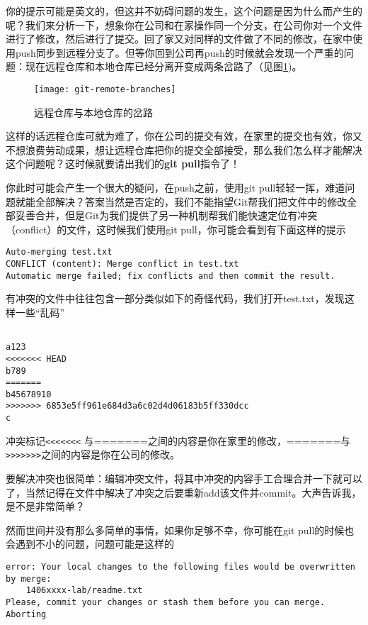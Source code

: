 你的提示可能是英文的，但这并不妨碍问题的发生，这个问题是因为什么而产生的呢？我们来分析一下，想象你在公司和在家操作同一个分支，在公司你对一个文件进行了修改，然后进行了提交。回了家又对同样的文件做了不同的修改，在家中使用push同步到远程分支了。但等你回到公司再push的时候就会发现一个严重的问题：现在远程仓库和本地仓库已经分离开变成两条岔路了（见图\ref{git-remote-branches})。

\begin{figure}[htbp]
  \centering
  \texttt{[image: git-remote-branches]}
  \caption{远程仓库与本地仓库的岔路}\label{git-remote-branches}
\end{figure}

这样的话远程仓库可就为难了，你在公司的提交有效，在家里的提交也有效，你又不想浪费劳动成果，想让远程仓库把你的提交全部接受，那么我们怎么样才能解决这个问题呢？这时候就要请出我们的\textbf{git pull}指令了！

你此时可能会产生一个很大的疑问，在push之前，使用git pull轻轻一挥，难道问题就能全部解决？答案当然是否定的，我们不能指望Git帮我们把文件中的修改全部妥善合并，但是Git为我们提供了另一种机制帮我们能快速定位有冲突（conflict）的文件，这时候我们使用git pull，你可能会看到有下面这样的提示

\begin{verbatim}
Auto-merging test.txt
CONFLICT (content): Merge conflict in test.txt
Automatic merge failed; fix conflicts and then commit the result.
\end{verbatim}

有冲突的文件中往往包含一部分类似如下的奇怪代码，我们打开test.txt，发现这样一些“乱码”

\begin{verbatim}

a123
<<<<<<< HEAD
b789
=======
b45678910
>>>>>>> 6853e5ff961e684d3a6c02d4d06183b5ff330dcc
c
\end{verbatim}

冲突标记\verb|<<<<<<<| 与=======之间的内容是你在家里的修改，=======与\verb|>>>>>>>|之间的内容是你在公司的修改。

要解决冲突也很简单：编辑冲突文件，将其中冲突的内容手工合理合并一下就可以了，当然记得在文件中解决了冲突之后要重新add该文件并commit。大声告诉我，是不是非常简单？

然而世间并没有那么多简单的事情，如果你足够不幸，你可能在git pull的时候也会遇到不小的问题，问题可能是这样的

\begin{verbatim}
error: Your local changes to the following files would be overwritten by merge:
	1406xxxx-lab/readme.txt
Please, commit your changes or stash them before you can merge.
Aborting
\end{verbatim}

